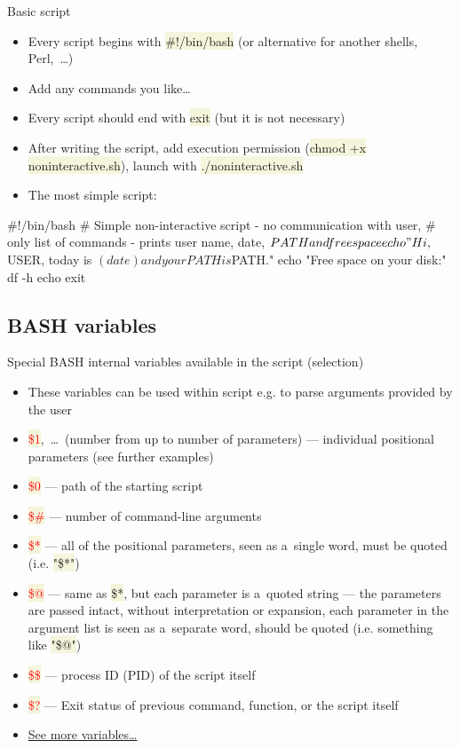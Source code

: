 \documentclass[compress, xelatex, 11pt, xcolor=svgnames, aspectratio=169, url={hyphens, lowtilde}]{beamer}
\renewcommand{\texttt}[1]{\colorbox{Beige}{{\ttfamily #1}}}
\renewcommand{\alert}[1]{\textcolor{red}{#1}}
\begin{document}
\begin{frame}[fragile]{Basic script}
	\begin{itemize}
		\item Every script begins with \texttt{\#!/bin/bash} (or alternative for another shells, Perl,~\ldots)
		\item Add any commands you like\ldots
		\item Every script should end with \texttt{exit} (but it is not necessary)
		\item After writing the script, add execution permission (\texttt{chmod +x noninteractive.sh}), launch with \texttt{./noninteractive.sh}
		\item The most simple script:
	\end{itemize}
	\vfill
	\begin{bashcode}
    #!/bin/bash
    # Simple non-interactive script - no communication with user,
    # only list of commands - prints user name, date, $PATH and free space
    echo "Hi, ${USER}, today is $(date) and your PATH is ${PATH}."
    echo "Free space on your disk:"
    df -h
    echo
    exit
	\end{bashcode}
\end{frame}

\subsection{BASH variables}

\begin{frame}{Special BASH internal variables available in the script (selection)}
	\begin{itemize}
		\item These variables can be used within script e.g. to parse arguments provided by the user
		\item \alert{\texttt{\$1}},~\ldots~(number from \texttt{1} up to number of parameters) --- individual positional parameters (see further examples)
		\item \alert{\texttt{\$0}} --- path of the starting script
		\item \alert{\texttt{\$\#}} --- number of command-line arguments
		\item \alert{\texttt{\$*}} --- all of the positional parameters, seen as a~single word, must be quoted (i.e. \texttt{"\$*"})
		\item \alert{\texttt{\$@}} --- same as \texttt{\$*}, but each parameter is a~quoted string --- the parameters are passed intact, without interpretation or expansion, each parameter in the argument list is seen as a~separate word, should be quoted (i.e. something like \texttt{"\$@"})
		\item \alert{\texttt{\$\$}} --- process ID (PID) of the script itself
		\item \alert{\texttt{\$?}} --- Exit status of previous command, function, or the script itself
		\item \href{https://tldp.org/LDP/abs/html/internalvariables.html}{See more variables\ldots}
	\end{itemize}
\end{frame}
\end{document}
